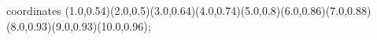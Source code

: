 					coordinates { (1.0,0.54)(2.0,0.5)(3.0,0.64)(4.0,0.74)(5.0,0.8)(6.0,0.86)(7.0,0.88)(8.0,0.93)(9.0,0.93)(10.0,0.96)};
